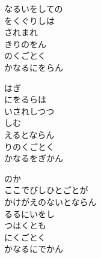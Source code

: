 \documentclass[10pt,b5j]{tarticle} %
\begin{document}
\vspace{1.5em} %
\newcommand{\linespace}{0.5em} %
\newcommand{\blocksize}{0.5\hsize} %
\begin{enumerate} %
    \begin{minipage}[c]{\blocksize}
    
        \vspace{\linespace}
        \item
        なるいをしての\\
        をくぐりしは\\
        されまれ\\
        きりのをん\\
        のくごとく\\
        かなるにをらん
        
        \vspace{\linespace}
        \item
        はぎ\\
        にをるらは\\
        いされしつつ\\
        しむ\\
        えるとならん\\
        りのくごとく\\
        かなるをぎかん
        
        \vspace{\linespace}
        \item
        のか\\
        ここでびしひとごとが\\
        かけがえのないとならん\\
        るるにいをし\\
        つはくとも\\
        にくごとく\\
        かなるにでかん

    
    \end{minipage}
\end{enumerate} %
\end{document}
